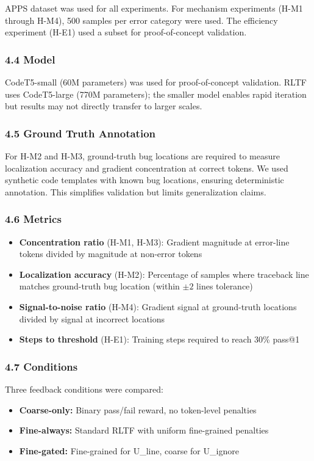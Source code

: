 APPS dataset was used for all experiments. For mechanism experiments (H-M1 through H-M4), 500 samples per error category were used. The efficiency experiment (H-E1) used a subset for proof-of-concept validation.

\subsubsection{4.4 Model}

CodeT5-small (60M parameters) was used for proof-of-concept validation. RLTF uses CodeT5-large (770M parameters); the smaller model enables rapid iteration but results may not directly transfer to larger scales.

\subsubsection{4.5 Ground Truth Annotation}

For H-M2 and H-M3, ground-truth bug locations are required to measure localization accuracy and gradient concentration at correct tokens. We used synthetic code templates with known bug locations, ensuring deterministic annotation. This simplifies validation but limits generalization claims.

\subsubsection{4.6 Metrics}

\begin{itemize}
\item \textbf{Concentration ratio} (H-M1, H-M3): Gradient magnitude at error-line tokens divided by magnitude at non-error tokens
\item \textbf{Localization accuracy} (H-M2): Percentage of samples where traceback line matches ground-truth bug location (within $\pm 2$ lines tolerance)
\item \textbf{Signal-to-noise ratio} (H-M4): Gradient signal at ground-truth locations divided by signal at incorrect locations
\item \textbf{Steps to threshold} (H-E1): Training steps required to reach 30\% pass@1
\end{itemize}

\subsubsection{4.7 Conditions}

Three feedback conditions were compared:

\begin{itemize}
\item \textbf{Coarse-only:} Binary pass/fail reward, no token-level penalties
\item \textbf{Fine-always:} Standard RLTF with uniform fine-grained penalties
\item \textbf{Fine-gated:} Fine-grained for U\_line, coarse for U\_ignore
\end{itemize}

